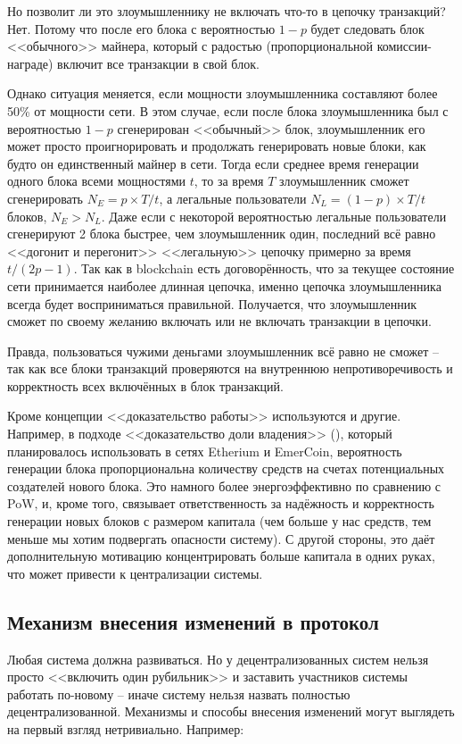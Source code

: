 Но позволит ли это злоумышленнику не включать что-то в цепочку транзакций? Нет. Потому что после его блока с вероятностью $1 - p$ будет следовать блок <<обычного>> майнера, который с радостью (пропорциональной комиссии-награде) включит все транзакции в свой блок.

Однако ситуация меняется, если мощности злоумышленника составляют более 50\% от мощности сети. В этом случае, если после блока злоумышленника был с вероятностью $1 - p$ сгенерирован <<обычный>> блок, злоумышленник его может просто проигнорировать и продолжать генерировать новые блоки, как будто он единственный майнер в сети. Тогда если среднее время генерации одного блока всеми мощностями $t$, то за время $T$ злоумышленник сможет сгенерировать $N_E = p \times T / t$, а легальные пользователи $N_L = (1 - p) \times T / t$ блоков, $N_E > N_L$. Даже если с некоторой вероятностью легальные пользователи сгенерируют 2 блока быстрее, чем злоумышленник один, последний всё равно <<догонит и перегонит>> <<легальную>> цепочку примерно за время $t / (2p - 1)$. Так как в blockchain есть договорённость, что за текущее состояние сети принимается наиболее длинная цепочка, именно цепочка злоумышленника всегда будет восприниматься правильной. Получается, что злоумышленник сможет по своему желанию включать или не включать транзакции в цепочки.

Правда, пользоваться чужими деньгами злоумышленник всё равно не сможет -- так как все блоки транзакций проверяются на внутреннюю непротиворечивость и корректность всех включённых в блок транзакций.

Кроме концепции <<доказательство работы>> используются и другие. Например, в подходе <<доказательство доли владения>> (), который планировалось использовать в сетях Etherium и EmerCoin, вероятность генерации блока пропорциональна количеству средств на счетах потенциальных создателей нового блока. Это намного более энергоэффективно по сравнению с PoW, и, кроме того, связывает ответственность за надёжность и корректность генерации новых блоков с размером капитала (чем больше у нас средств, тем меньше мы хотим подвергать опасности систему). С другой стороны, это даёт дополнительную мотивацию концентрировать больше капитала в одних руках, что может привести к централизации системы.

\subsection{Механизм внесения изменений в протокол}
Любая система должна развиваться. Но у децентрализованных систем нельзя просто <<включить один рубильник>> и заставить участников системы работать по-новому -- иначе систему нельзя назвать полностью децентрализованной. Механизмы и способы внесения изменений могут выглядеть на первый взгляд нетривиально. Например:

